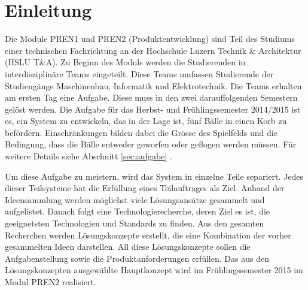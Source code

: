 \section{Einleitung}
Die Module PREN1 und PREN2 (Produktentwicklung) sind Teil des Studiums einer 
technischen Fachrichtung an der Hochschule Luzern Technik \& Architektur 
(HSLU T\&A). 
Zu Beginn des Moduls werden die Studierenden in interdisziplinäre Teams 
eingeteilt. Diese Teams umfassen Studierende der Studiengänge Maschinenbau, 
Informatik und Elektrotechnik. Die Teams erhalten am ersten Tag eine Aufgabe. 
Diese muss in den zwei darauffolgenden Semestern gelöst werden. 
Die Aufgabe für das Herbst- und Frühlingssemester 2014/2015 ist es, ein System 
zu entwickeln, das in der Lage ist, fünf Bälle in einen Korb zu befördern. 
Einschränkungen bilden dabei die Grösse des Spielfelds und die Bedingung, dass 
die Bälle entweder geworfen oder geflogen werden müssen. 
Für weitere Details siehe Abschnitt \ref{sec:aufgabe} . 

\noindent Um diese Aufgabe zu meistern, wird das System in einzelne Teile 
separiert. Jedes dieser Teilsysteme hat die Erfüllung eines Teilauftrages als 
Ziel. Anhand der Ideensammlung werden möglichst viele Lösungsansätze gesammelt 
und aufgelistet. Danach folgt eine Technologierecherche, deren Ziel es ist, 
die geeignetsten Technologien und Standards zu finden. Aus den gesamten 
Recherchen werden Lösungskonzepte erstellt, die eine Kombination der vorher 
gesammelten Ideen darstellen. All diese Lösungskonzepte sollen die 
Aufgabenstellung sowie die Produktanforderungen erfüllen. Das aus den 
Lösungskonzepten ausgewählte Hauptkonzept wird im Frühlingssemester 2015 im 
Modul PREN2 realisiert.
